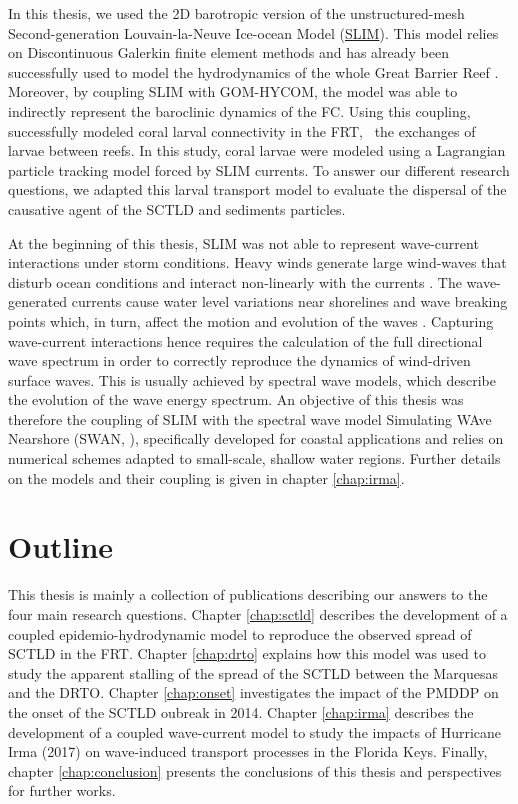 In this thesis, we used the 2D barotropic version of the unstructured-mesh Second-generation Louvain-la-Neuve Ice-ocean Model (\href{https://www.slim-ocean.be/}{SLIM}). This model relies on Discontinuous Galerkin finite element methods \citep{aizinger2002discontinuous} and has already been successfully used to model the hydrodynamics of the whole Great Barrier Reef \citep{lambrechts2008multi}. Moreover, by coupling SLIM with GOM-HYCOM, the model was able to indirectly represent the baroclinic dynamics of the FC. Using this coupling, \cite{frys2020fine} successfully modeled coral larval connectivity in the FRT, \ie~the exchanges of larvae between reefs. In this study, coral larvae were modeled using a Lagrangian particle tracking model \citep{van2018lagrangian} forced by SLIM currents. To answer our different research questions, we adapted this larval transport model to evaluate the dispersal of the causative agent of the SCTLD and sediments particles.

At the beginning of this thesis, SLIM was not able to represent wave-current interactions under storm conditions. Heavy winds generate large wind-waves that disturb ocean conditions and interact non-linearly with the currents \citep{liu2020impacts,wu2011fvcom}. The wave-generated currents cause water level variations near shorelines and wave breaking points which, in turn, affect the motion and evolution of the waves \citep{longuet1970longshore, sikiric2013coupling}. Capturing wave-current interactions hence requires the calculation of the full directional wave spectrum in order to correctly reproduce the dynamics of wind-driven surface waves. This is usually achieved by spectral wave models, which describe the evolution of the wave energy spectrum. An objective of this thesis was therefore the coupling of SLIM with the spectral wave model Simulating WAve Nearshore (SWAN, \citealp{booij1999third}), specifically developed for coastal applications and relies on numerical schemes adapted to small-scale, shallow water regions. Further details on the models and their coupling is given in chapter \ref{chap:irma}.

\section*{Outline}
This thesis is mainly a collection of publications describing our answers to the four main research questions. Chapter \ref{chap:sctld} describes the development of a coupled epidemio-hydrodynamic model to reproduce the observed spread of SCTLD in the FRT. Chapter \ref{chap:drto} explains how this model was used to study the apparent stalling of the spread of the SCTLD between the Marquesas and the DRTO. Chapter \ref{chap:onset} investigates the impact of the PMDDP on the onset of the SCTLD oubreak in 2014. Chapter \ref{chap:irma} describes the development of a coupled wave-current model to study the impacts of Hurricane Irma (2017) on wave-induced transport processes in the Florida Keys. Finally, chapter \ref{chap:conclusion} presents the conclusions of this thesis and perspectives for further works. 

